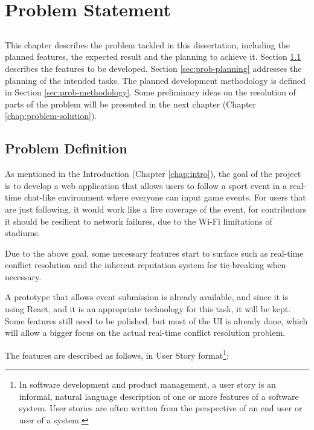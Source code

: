 \chapter{Problem Statement}\label{chap:problem}

\section*{}

This chapter describes the problem tackled in this dissertation, including the planned features, the expected result and the planning to achieve it. Section \ref{sec:prob-def} describes the features to be developed. Section \ref{sec:prob-planning} addresses the planning of the intended tasks. The planned development methodology is defined in Section \ref{sec:prob-methodology}. Some preliminary ideas on the resolution of parts of the problem will be presented in the next chapter (Chapter \ref{chap:problem-solution}). 

\section{Problem Definition}\label{sec:prob-def}

As mentioned in the Introduction (Chapter \ref{chap:intro}), the goal of the project is to develop a web application that allows users to follow a sport event in a real-time chat-like environment where everyone can input game events. For users that are just following, it would work like a live coverage of the event, for contributors it should be resilient to network failures, due to the Wi-Fi limitations of stadiums.

Due to the above goal, some necessary features start to surface such as real-time conflict resolution and the inherent reputation system for tie-breaking when necessary. 

A prototype that allows event submission is already available, and since it is using React, and it is an appropriate technology for this task, it will be kept. Some features still need to be polished, but most of the UI is already done, which will allow a bigger focus on the actual real-time conflict resolution problem.

The features are described as follows, in User Story format\footnote{In software development and product management, a user story is an informal, natural language description of one or more features of a software system. User stories are often written from the perspective of an end user or user of a system.}:

